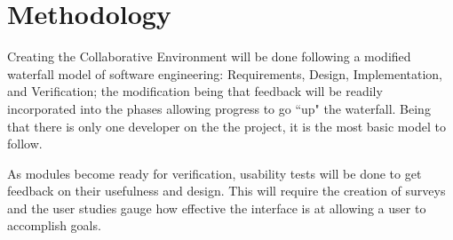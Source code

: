 \section{Methodology}
\label{sec:methodology}

Creating the Collaborative Environment will be done following a modified waterfall model of software engineering: Requirements, Design, Implementation, and Verification; the modification being that feedback will be readily incorporated into the phases allowing progress to go ``up" the waterfall. Being that there is only one developer on the the project, it is the most basic model to follow.

As modules become ready for verification, usability tests will be done to get feedback on their usefulness and design. This will require the creation of surveys and the user studies gauge how effective the interface is at allowing a user to accomplish goals.
